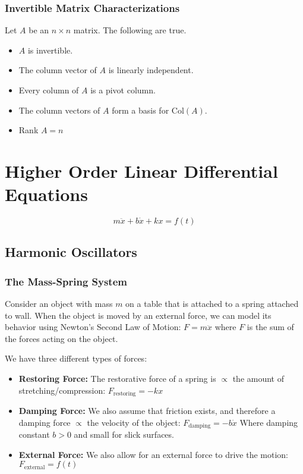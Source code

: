 \documentclass[12pt,landscape,twocolumn]{article}
\begin{document}
        \subsubsection{Invertible Matrix Characterizations}
        Let $A$ be an $n \times n$ matrix. The following are true.
        \begin{itemize}
            \item $A$ is invertible.
            \item The column vector of $A$ is linearly independent.
            \item Every column of $A$ is a pivot column.
            \item The column vectors of $A$ form a basis for Col$(A)$.
            \item Rank $A = n$
        \end{itemize}
\section{Higher Order Linear Differential Equations}
    \begin{equation}\label{eq:2lde}
        m \ddot{x} + b \dot{x} + kx = f(t)
    \end{equation}
    \subsection{Harmonic Oscillators}
        \subsubsection{The Mass-Spring System}
        Consider an object with mass $m$ on a table that is attached to a spring attached to wall. When the object is moved by an external force, we can model its behavior using Newton's Second Law of Motion: $F = m \ddot{x}$ where $F$ is the sum of the forces acting on the object.

        We have three different types of forces:

            \begin{itemize}
                \item \textbf{Restoring Force:} The restorative force of a spring is $\propto$ the amount of stretching/compression:
                    $ F_{\text{restoring} } = -k x $
                \item \textbf{Damping Force:} We also assume that friction exists, and therefore a damping force $\propto$ the velocity of the object:
                    $ F_{\text{damping} } = -b \dot{x} $
                    Where damping constant $b > 0$ and small for slick surfaces.
                \item \textbf{External Force:} We also allow for an external force to drive the motion:
                    $ F_{\text{external} } = f(t) $
            \end{itemize}
\end{document}
